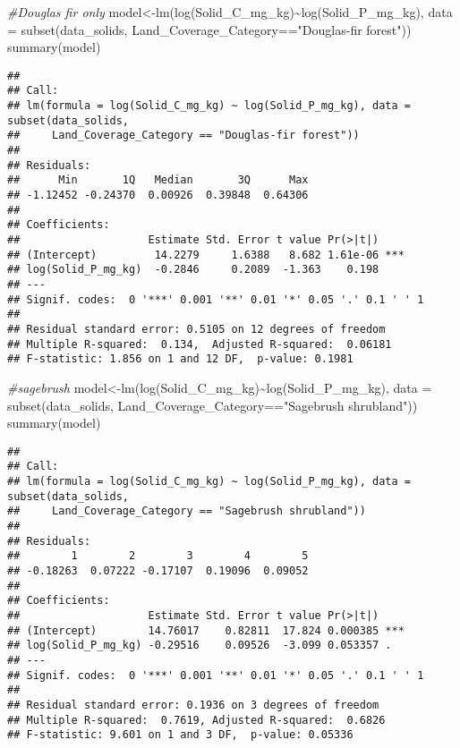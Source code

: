 \documentclass[
]{article}
\newenvironment{Shaded}{\begin{snugshade}}{\end{snugshade}}
\newcommand{\AttributeTok}[1]{\textcolor[rgb]{0.77,0.63,0.00}{#1}}
\newcommand{\CommentTok}[1]{\textcolor[rgb]{0.56,0.35,0.01}{\textit{#1}}}
\newcommand{\FunctionTok}[1]{\textcolor[rgb]{0.00,0.00,0.00}{#1}}
\newcommand{\NormalTok}[1]{#1}
\newcommand{\OtherTok}[1]{\textcolor[rgb]{0.56,0.35,0.01}{#1}}
\newcommand{\SpecialCharTok}[1]{\textcolor[rgb]{0.00,0.00,0.00}{#1}}
\newcommand{\StringTok}[1]{\textcolor[rgb]{0.31,0.60,0.02}{#1}}
\begin{document}
\begin{Shaded}
\begin{Highlighting}[]
\CommentTok{\#Douglas fir only}
\NormalTok{model}\OtherTok{\textless{}{-}}\FunctionTok{lm}\NormalTok{(}\FunctionTok{log}\NormalTok{(Solid\_C\_mg\_kg)}\SpecialCharTok{\textasciitilde{}}\FunctionTok{log}\NormalTok{(Solid\_P\_mg\_kg), }\AttributeTok{data =} \FunctionTok{subset}\NormalTok{(data\_solids, Land\_Coverage\_Category}\SpecialCharTok{==}\StringTok{"Douglas{-}fir forest"}\NormalTok{))}
\FunctionTok{summary}\NormalTok{(model)}
\end{Highlighting}
\end{Shaded}

\begin{verbatim}
## 
## Call:
## lm(formula = log(Solid_C_mg_kg) ~ log(Solid_P_mg_kg), data = subset(data_solids, 
##     Land_Coverage_Category == "Douglas-fir forest"))
## 
## Residuals:
##      Min       1Q   Median       3Q      Max 
## -1.12452 -0.24370  0.00926  0.39848  0.64306 
## 
## Coefficients:
##                    Estimate Std. Error t value Pr(>|t|)    
## (Intercept)         14.2279     1.6388   8.682 1.61e-06 ***
## log(Solid_P_mg_kg)  -0.2846     0.2089  -1.363    0.198    
## ---
## Signif. codes:  0 '***' 0.001 '**' 0.01 '*' 0.05 '.' 0.1 ' ' 1
## 
## Residual standard error: 0.5105 on 12 degrees of freedom
## Multiple R-squared:  0.134,  Adjusted R-squared:  0.06181 
## F-statistic: 1.856 on 1 and 12 DF,  p-value: 0.1981
\end{verbatim}

\begin{Shaded}
\begin{Highlighting}[]
\CommentTok{\#sagebrush}
\NormalTok{model}\OtherTok{\textless{}{-}}\FunctionTok{lm}\NormalTok{(}\FunctionTok{log}\NormalTok{(Solid\_C\_mg\_kg)}\SpecialCharTok{\textasciitilde{}}\FunctionTok{log}\NormalTok{(Solid\_P\_mg\_kg), }\AttributeTok{data =} \FunctionTok{subset}\NormalTok{(data\_solids, Land\_Coverage\_Category}\SpecialCharTok{==}\StringTok{"Sagebrush shrubland"}\NormalTok{))}
\FunctionTok{summary}\NormalTok{(model)}
\end{Highlighting}
\end{Shaded}

\begin{verbatim}
## 
## Call:
## lm(formula = log(Solid_C_mg_kg) ~ log(Solid_P_mg_kg), data = subset(data_solids, 
##     Land_Coverage_Category == "Sagebrush shrubland"))
## 
## Residuals:
##        1        2        3        4        5 
## -0.18263  0.07222 -0.17107  0.19096  0.09052 
## 
## Coefficients:
##                    Estimate Std. Error t value Pr(>|t|)    
## (Intercept)        14.76017    0.82811  17.824 0.000385 ***
## log(Solid_P_mg_kg) -0.29516    0.09526  -3.099 0.053357 .  
## ---
## Signif. codes:  0 '***' 0.001 '**' 0.01 '*' 0.05 '.' 0.1 ' ' 1
## 
## Residual standard error: 0.1936 on 3 degrees of freedom
## Multiple R-squared:  0.7619, Adjusted R-squared:  0.6826 
## F-statistic: 9.601 on 1 and 3 DF,  p-value: 0.05336
\end{verbatim}
\end{document}
